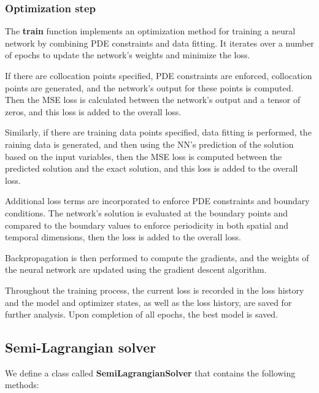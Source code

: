 \documentclass{article}
\begin{document}
\subsubsection{Optimization step}

The \textbf{train} function implements an optimization method for training a neural network by combining PDE constraints and data fitting. It iterates over a number of epochs to update the network's weights and minimize the loss.


If there are collocation points specified, PDE constraints are enforced, collocation points are generated, and the network's output for these points is computed. Then the MSE loss is calculated between the network's output and a tensor of zeros, and this loss is added to the overall loss.

Similarly, if there are training data points specified, data fitting is performed, the raining data is generated, and then using the NN's prediction of the solution based on the input variables, then the MSE loss is computed between the predicted solution and the exact solution, and this loss is added to the overall loss.

Additional loss terms are incorporated to enforce PDE constraints and boundary conditions. The network's solution is evaluated at the boundary points and compared to the boundary values to enforce periodicity in both spatial and temporal dimensions, then the loss is added to the overall loss.

Backpropagation is then performed to compute the gradients, and the weights of the neural network are updated using the gradient descent algorithm.

Throughout the training process, the current loss is recorded in the loss history and the model and optimizer states, as well as the loss history, are saved for further analysis. Upon completion of all epochs, the best model is saved.

\subsection{Semi-Lagrangian solver}

We define a class called \textbf{SemiLagrangianSolver} that contains the following methods:
\end{document}
